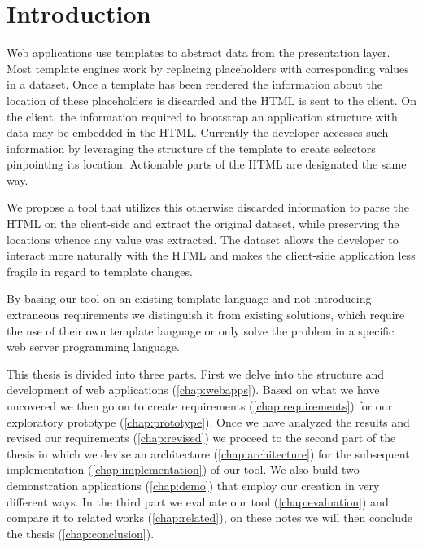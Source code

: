 \documentclass[thesis.tex]{subfiles}
\begin{document}
\chapter{Introduction}
\label{chap:intro}
Web applications use templates to abstract data from the presentation layer.
Most template engines work by replacing placeholders with corresponding values
in a dataset.
Once a template has been rendered the information about the location of these
placeholders is discarded and the HTML is sent to the client.
On the client, the information required to bootstrap an application structure
with data may be embedded in the HTML. Currently the developer accesses such
information by leveraging the structure of the template to create selectors
pinpointing its location. Actionable parts of the HTML are designated the same
way.

We propose a tool that utilizes this otherwise discarded information to parse
the HTML on the client-side and extract the original dataset, while preserving
the locations whence any value was extracted. The dataset allows the developer
to interact more naturally with the HTML and makes the client-side application
less fragile in regard to template changes.

By basing our tool on an existing template language and not introducing
extraneous requirements we distinguish it from existing solutions,
which require the use of their own template language or only solve the problem
in a specific web server programming language.


This thesis is divided into three parts. First we delve into the structure
and development of web applications (\ref{chap:webapps}). Based on what we have
uncovered we then go on to create requirements (\ref{chap:requirements}) for our
exploratory prototype (\ref{chap:prototype}).
Once we have analyzed the results and revised our requirements
(\ref{chap:revised}) we proceed to the second part of the thesis in which we
devise an architecture (\ref{chap:architecture}) for the subsequent
implementation (\ref{chap:implementation}) of our tool. We also build two
demonstration applications (\ref{chap:demo}) that employ our creation in very
different ways.
In the third part we evaluate our tool (\ref{chap:evaluation}) and
compare it to related works (\ref{chap:related}), on these notes we will then
conclude the thesis (\ref{chap:conclusion}).
\end{document}

